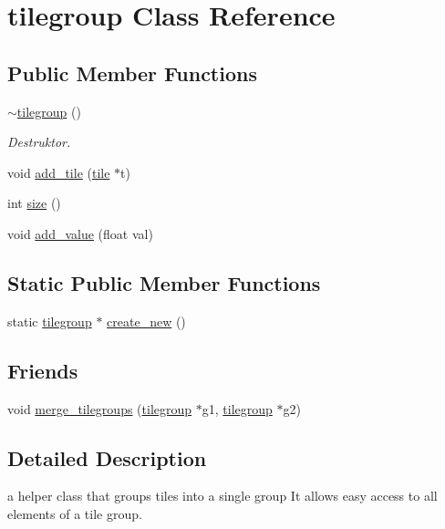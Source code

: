 \hypertarget{classtilegroup}{\section{tilegroup Class Reference}
\label{classtilegroup}
}
\subsection*{Public Member Functions}
\begin{DoxyCompactItemize}
\item 
\hyperlink{classtilegroup_aa6c6f357f5ff2da2c609ec88695256dc}{$\sim$tilegroup} ()
\begin{DoxyCompactList}\small\item\em Destruktor. \end{DoxyCompactList}\item 
void \hyperlink{classtilegroup_a4bec8ed94afb7cf220641232f86e92eb}{add\-\_\-tile} (\hyperlink{classtile}{tile} $\ast$t)
\item 
int \hyperlink{classtilegroup_a77326f80d6ec031a7429f574591cc3ee}{size} ()
\item 
void \hyperlink{classtilegroup_a2c453918b11a2bc1f0cd5f8f7746a5b7}{add\-\_\-value} (float val)
\end{DoxyCompactItemize}
\subsection*{Static Public Member Functions}
\begin{DoxyCompactItemize}
\item 
static \hyperlink{classtilegroup}{tilegroup} $\ast$ \hyperlink{classtilegroup_a1f6b1c44202332fa7271bae39e30981d}{create\-\_\-new} ()
\end{DoxyCompactItemize}
\subsection*{Friends}
\begin{DoxyCompactItemize}
\item 
void \hyperlink{classtilegroup_ae067cbd35e55edd62f9eb0158d925a21}{merge\-\_\-tilegroups} (\hyperlink{classtilegroup}{tilegroup} $\ast$g1, \hyperlink{classtilegroup}{tilegroup} $\ast$g2)
\end{DoxyCompactItemize}


\subsection{Detailed Description}
a helper class that groups tiles into a single group It allows easy access to all elements of a tile group. 

